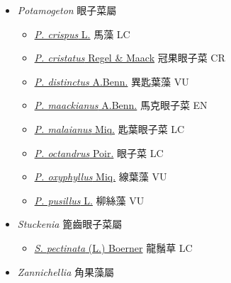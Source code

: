 
  \begin{itemize}
 \item[] \textit{Potamogeton} 眼子菜屬
                    
  \begin{itemize}
        \item[] \href{http://www.theplantlist.org/tpl1.1/search?q=Potamogeton+crispus}{\textit{P. crispus} L.}   馬藻 LC
        \item[] \href{http://www.theplantlist.org/tpl1.1/search?q=Potamogeton+cristatus}{\textit{P. cristatus} Regel \& Maack}   冠果眼子菜 CR
        \item[] \href{http://www.theplantlist.org/tpl1.1/search?q=Potamogeton+distinctus}{\textit{P. distinctus} A.Benn.}   異匙葉藻 VU
        \item[] \href{http://www.theplantlist.org/tpl1.1/search?q=Potamogeton+maackianus}{\textit{P. maackianus} A.Benn.}   馬克眼子菜 EN
        \item[] \href{http://www.theplantlist.org/tpl1.1/search?q=Potamogeton+malaianus}{\textit{P. malaianus} Miq.}   匙葉眼子菜 LC
        \item[] \href{http://www.theplantlist.org/tpl1.1/search?q=Potamogeton+octandrus}{\textit{P. octandrus} Poir.}   眼子菜 LC
        \item[] \href{http://www.theplantlist.org/tpl1.1/search?q=Potamogeton+oxyphyllus}{\textit{P. oxyphyllus} Miq.}   線葉藻 VU
        \item[] \href{http://www.theplantlist.org/tpl1.1/search?q=Potamogeton+pusillus}{\textit{P. pusillus} L.}   柳絲藻 VU
  \end{itemize}
 \item[] \textit{Stuckenia} 篦齒眼子菜屬
                    
  \begin{itemize}
        \item[] \href{http://www.theplantlist.org/tpl1.1/search?q=Stuckenia+pectinata}{\textit{S. pectinata} (L.) Boerner}     龍鬚草 LC
  \end{itemize}
 \item[] \textit{Zannichellia} 角果藻屬
                    

\end{itemize}
